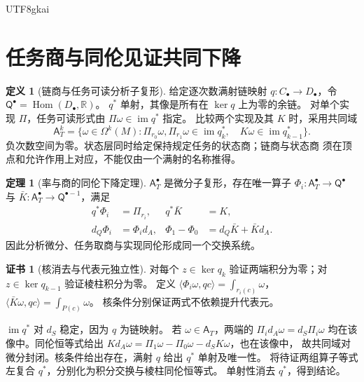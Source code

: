 \documentclass[12pt]{report}
\makeatletter
\theoremstyle{definition}
\newtheorem{definition}{定义}[chapter]
\newtheorem{theorem}{定理}[chapter]
\newtheorem{Certificate}{证书}[chapter]
\renewenvironment{proof}[1][\proofname]{\par
  \pushQED{\qed}\normalfont
  \topsep6\p@\@plus6\p@\relax
  \trivlist
  \item[\hskip\labelsep\normalfont #1\@addpunct{.}]\ignorespaces
}{
  \popQED\endtrivlist\@endpefalse
}
\newcommand{\RR}{\mathbb R}
\newcommand{\im}{\operatorname{im}}
\newcommand{\Hom}{\operatorname{Hom}}
\makeatother
\begin{document}
\begin{CJK*}{UTF8}{gkai}
\section{任务商与同伦见证共同下降}
\begin{definition}[链商与任务可读分析子复形]
\label{def:analytic-task-quotient}
给定逐次数满射链映射 \(q:C_\bullet\to D_\bullet\)，令
\(\mathsf Q^\bullet=\Hom(D_\bullet,\RR)\)。
\(q^*\) 单射，其像是所有在 \(\ker q\) 上为零的余链。
对单个实现 \(\Pi\)，任务可读形式由 \(\Pi\omega\in\im q^*\) 指定。
比较两个实现及其 \(K\) 时，采用共同域
\[
\mathsf A_T^k=\{\omega\in\Omega^k(M):
\Pi_{r_0}\omega,\Pi_{r_1}\omega\in\im q_k^*,\quad
K\omega\in\im q_{k-1}^*\}.
\]
负次数空间为零。状态层同时给定保持规定任务的状态商；链商与状态商
须在顶点和允许作用上对应，不能仅由一个满射的名称推得。
\end{definition}
\begin{theorem}[率与商的同伦下降定理]
\label{thm:homotopy-descent}
\(\mathsf A_T^\bullet\) 是微分子复形，存在唯一算子
\(\Phi_i:\mathsf A_T^\bullet\to\mathsf Q^\bullet\) 与
\(\bar K:\mathsf A_T^\bullet\to\mathsf Q^{\bullet-1}\)，满足
\[
\begin{aligned}
q^*\Phi_i&=\Pi_{r_i},&q^*\bar K&=K,\\
d_Q\Phi_i&=\Phi_i d_A,&
\Phi_1-\Phi_0&=d_Q\bar K+\bar Kd_A.
\end{aligned}
\]
因此分析微分、任务取商与实现同伦形成同一个交换系统。
\end{theorem}
\begin{Certificate}[核消去与代表元独立性]
对每个 \(z\in\ker q_k\) 验证两端积分为零；对
\(z\in\ker q_{k-1}\) 验证棱柱积分为零。
定义 \(\langle\Phi_i\omega,qc\rangle=\int_{r_i(c)}\omega\)，
\(\langle\bar K\omega,qc\rangle=\int_{P(c)}\omega\)。
核条件分别保证两式不依赖提升代表元。
\end{Certificate}
\begin{proof}
\(\im q^*\) 对 \(d_S\) 稳定，因为 \(q\) 为链映射。
若 \(\omega\in\mathsf A_T\)，两端的 \(\Pi_i d_A\omega=d_S\Pi_i\omega\)
均在该像中。同伦恒等式给出
\(Kd_A\omega=\Pi_1\omega-\Pi_0\omega-d_SK\omega\)，也在该像中，
故共同域对微分封闭。核条件给出存在，满射 \(q\) 给出 \(q^*\) 单射及唯一性。
将待证两组算子等式左复合 \(q^*\)，分别化为积分交换与棱柱同伦恒等式。
单射性消去 \(q^*\)，得到结论。
\end{proof}


\end{CJK*}
\end{document}

